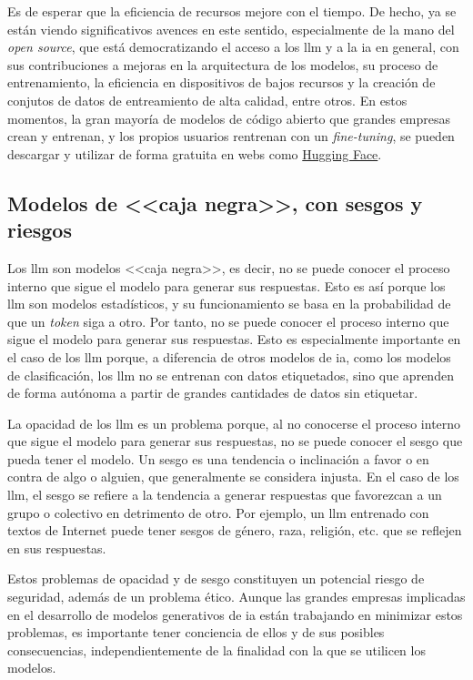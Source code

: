 Es de esperar que la eficiencia de recursos mejore con el tiempo. De hecho, ya se están viendo significativos avences en este sentido, especialmente de la mano del \emph{open source}, que está democratizando el acceso a los \gls{llm} y a la \gls{ia} en general, con sus contribuciones a mejoras en la arquitectura de los modelos, su proceso de entrenamiento, la eficiencia en dispositivos de bajos recursos y la creación de conjutos de datos de entreamiento de alta calidad, entre otros. En estos momentos, la gran mayoría de modelos de código abierto que grandes empresas crean y entrenan, y los propios usuarios rentrenan con un \emph{fine-tuning}, se pueden descargar y utilizar de forma gratuita en webs como \href{https://huggingface.co/}{Hugging Face}.


\subsection{Modelos de <<caja negra>>, con sesgos y riesgos}

Los \gls{llm} son modelos <<caja negra>>, es decir, no se puede conocer el proceso interno que sigue el modelo para generar sus respuestas. Esto es así porque los \gls{llm} son modelos estadísticos, y su funcionamiento se basa en la probabilidad de que un \emph{token} siga a otro. Por tanto, no se puede conocer el proceso interno que sigue el modelo para generar sus respuestas. Esto es especialmente importante en el caso de los \gls{llm} porque, a diferencia de otros modelos de \gls{ia}, como los modelos de clasificación, los \gls{llm} no se entrenan con datos etiquetados, sino que aprenden de forma autónoma a partir de grandes cantidades de datos sin etiquetar.

La opacidad de los \gls{llm} es un problema porque, al no conocerse el proceso interno que sigue el modelo para generar sus respuestas, no se puede conocer el sesgo que pueda tener el modelo. Un sesgo es una tendencia o inclinación a favor o en contra de algo o alguien, que generalmente se considera injusta. En el caso de los \gls{llm}, el sesgo se refiere a la tendencia a generar respuestas que favorezcan a un grupo o colectivo en detrimento de otro. Por ejemplo, un \gls{llm} entrenado con textos de Internet puede tener sesgos de género, raza, religión, etc. que se reflejen en sus respuestas.

Estos problemas de opacidad y de sesgo constituyen un potencial riesgo de seguridad, además de un problema ético. Aunque las grandes empresas implicadas en el desarrollo de modelos generativos de \gls{ia} están trabajando en minimizar estos problemas, es importante tener conciencia de ellos y de sus posibles consecuencias, independientemente de la finalidad con la que se utilicen los modelos.